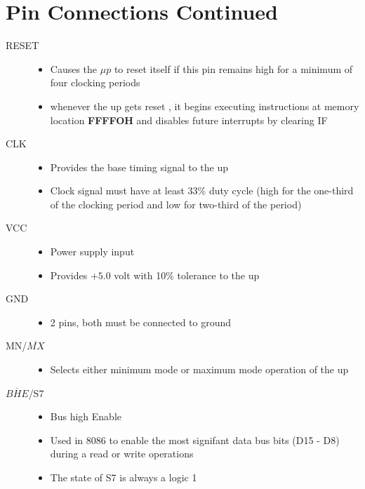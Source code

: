 \section{Pin Connections Continued}

\begin{description}

   \item[RESET]
   \begin{itemize}
       \item Causes the $\mu p$ to reset itself if this pin remains high for a minimum of four clocking periods
      \item whenever the up gets reset , it begins executing instructions at memory location \textbf{FFFFOH}
      and disables future interrupts by clearing IF
   \end{itemize}

   \item[CLK]
   \begin{itemize}
       \item  Provides the base timing signal to the up
       \item Clock signal must have at least 33\% duty cycle (high for the one-third
       of the clocking period and low for two-third of the period)

  \end{itemize}

  \item[VCC]
  \begin{itemize}
      \item Power supply input
      \item Provides $+5.0$ volt with 10\% tolerance to the up

  \end{itemize}

  \item[GND]
  \begin{itemize}
      \item 2 pins, both must be connected to ground

  \end{itemize}

  \item[MN/$\overline{MX}$]
  \begin{itemize}
      \item Selects either minimum mode or maximum mode operation of the up
  \end{itemize}


  \item[$\overline{BHE}$/S7]
  \begin{itemize}
      \item Bus high Enable
      \item Used in 8086 to enable the most signifant data bus bits (D15 - D8) during a read or
      write operations
      \item The state of S7 is always a logic 1
  \end{itemize}


\end{description}
